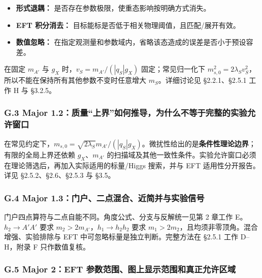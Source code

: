 \documentclass[
]{article}
\providecommand{\tightlist}{%
  \setlength{\itemsep}{0pt}\setlength{\parskip}{0pt}}
\begin{document}
\begin{itemize}
\tightlist
\item
  \textbf{形式退耦：} 是否存在参数极限，使重态影响按明确方式消失。
\item
  \textbf{EFT 积分消去：}
  目标能标是否低于相关物理阈值，且匹配/展开有效。
\item
  \textbf{数值忽略：}
  在指定观测量和参数域内，省略该态造成的误差是否小于预设容差。
\end{itemize}

在固定 \(m_{A'}\) 与 \(g_X\) 时，\(v_S=m_{A'}/(|q_S|g_X)\)
固定；常见归一化下
\(m_{s,0}^2=2\lambda_Sv_S^2\)，所以不能在保持所有其他参数不变时任意增大
\(m_S\)。详细讨论见 §2.2.1、§2.5.1 工作 H 与 §3.2.5。

\subsubsection{G.3 Major
1.2：质量``上界''如何推导，为什么不等于完整的实验允许窗口}\label{g.3-major-1.2ux8d28ux91cfux4e0aux754cux5982ux4f55ux63a8ux5bfcux4e3aux4ec0ux4e48ux4e0dux7b49ux4e8eux5b8cux6574ux7684ux5b9eux9a8cux5141ux8bb8ux7a97ux53e3}

在常见约定下，\(m_{s,0}=\sqrt{2\lambda_S}m_{A'}/(|q_S|g_X)\)。微扰性给出的是\textbf{条件性理论边界}；有限的全局上界还依赖
\(g_X\)、\(m_{A'}\)
的扫描域及其他一致性条件。实验允许窗口必须在理论筛选后，再加入实际适用的标量/Higgs
搜索，并与 EFT 适用性分开报告。详见 §2.5.2、§2.6、§2.5.3 与 §3.5。

\subsubsection{G.4 Major
1.3：门户、二点混合、近简并与实验信号}\label{g.4-major-1.3ux95e8ux6237ux4e8cux70b9ux6df7ux5408ux8fd1ux7b80ux5e76ux4e0eux5b9eux9a8cux4fe1ux53f7}

门户四点算符与二点自能不同。角度公式、分支与反解统一见第 2 章工作
E。\(h_2\to A'A'\) 要求 \(m_2>2m_{A'}\)，\(h_1\to h_2h_2\) 要求
\(m_1>2m_2\)，且均须非零顶角。混合增强、实验排除与 EFT
中可忽略标量是独立判断。完整方法在 §2.5.1 工作 D--H，附录 F
只作数值复核。

\subsubsection{G.5 Major 2：EFT
参数范围、图上显示范围和真正允许区域}\label{g.5-major-2eft-ux53c2ux6570ux8303ux56f4ux56feux4e0aux663eux793aux8303ux56f4ux548cux771fux6b63ux5141ux8bb8ux533aux57df}
\end{document}
